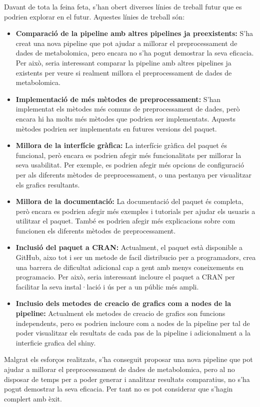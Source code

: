 \documentclass[ENG, BIB]{TFUOC}%
\begin{document}
Davant de tota la feina feta, s'han obert diverses línies de treball futur que es podrien explorar en el futur. Aquestes línies de treball són:
\begin{itemize}
    \item \textbf{Comparació de la pipeline amb altres pipelines ja preexistents:} S'ha creat una nova pipeline que pot ajudar a millorar el preprocessament de dades de metabolomica, pero encara no s'ha pogut demostrar la seva eficacia. Per això, seria interessant comparar la pipeline amb altres pipelines ja existents per veure si realment millora el preprocessament de dades de metabolomica.
    \item \textbf{Implementació de més mètodes de preprocessament:} S'han implementat els mètodes més comuns de preprocessament de dades, però encara hi ha molts més mètodes que podrien ser implementats. Aquests mètodes podrien ser implementats en futures versions del paquet.
    \item \textbf{Millora de la interfície gràfica:} La interfície gràfica del paquet és funcional, però encara es podrien afegir més funcionalitats per millorar la seva usabilitat. Per exemple, es podrien afegir més opcions de configuració per als diferents mètodes de preprocessament, o una pestanya per visualitzar els grafics resultants.
    \item \textbf{Millora de la documentació:} La documentació del paquet és completa, però encara es podrien afegir més exemples i tutorials per ajudar els usuaris a utilitzar el paquet. També es podrien afegir més explicacions sobre com funcionen els diferents mètodes de preprocessament.
    \item \textbf{Inclusió del paquet a CRAN:} Actualment, el paquet està disponible a GitHub, aixo tot i ser un metode de facil distribucio per a programadors, crea una barrera de dificultat adicional cap a gent amb menys coneixements en programacio. Per això, seria interessant incloure el paquet a CRAN per facilitar la seva instal·lació i ús per a un públic més ampli.
    \item \textbf{Inclusio dels metodes de creacio de grafics com a nodes de la pipeline:} Actualment els metodes de creacio de grafics son funcions independents, pero es podrien incloure com a nodes de la pipeline per tal de poder visualitzar els resultats de cada pas de la pipeline i adicionalment a la interficie grafica del shiny.
\end{itemize}

Malgrat els esforços realitzats, s'ha conseguit proposar una nova pipeline que pot ajudar a millorar el preprocessament de dades de metabolomica, pero al no disposar de temps per a poder generar i analitzar resultats comparatius, no s'ha pogut demostrar la seva eficacia. Per tant no es pot considerar que s'hagin complert amb èxit.
\end{document}
